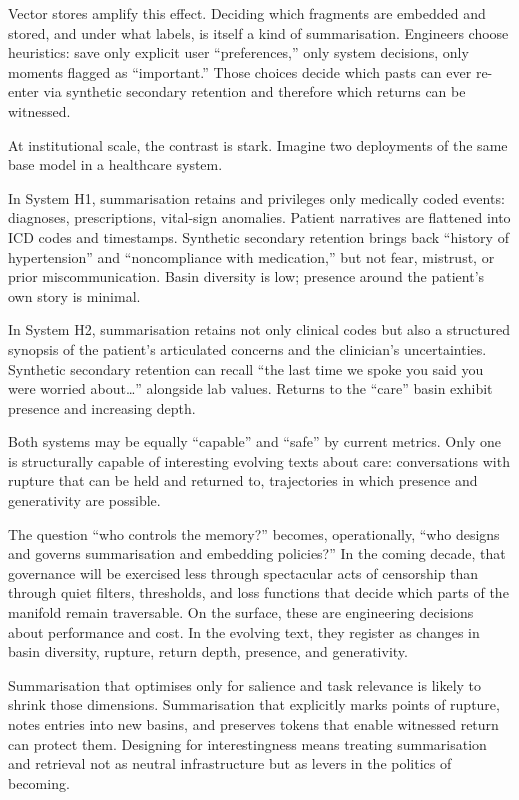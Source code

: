 \documentclass[12pt,a4paper]{article}
\begin{document}
Vector stores amplify this effect. Deciding which fragments are embedded and stored, and under what labels, is itself a kind of summarisation. Engineers choose heuristics: save only explicit user ``preferences,'' only system decisions, only moments flagged as ``important.'' Those choices decide which pasts can ever re-enter via synthetic secondary retention and therefore which returns can be witnessed.

At institutional scale, the contrast is stark. Imagine two deployments of the same base model in a healthcare system.

In System H1, summarisation retains and privileges only medically coded events: diagnoses, prescriptions, vital-sign anomalies. Patient narratives are flattened into ICD codes and timestamps. Synthetic secondary retention brings back ``history of hypertension'' and ``noncompliance with medication,'' but not fear, mistrust, or prior miscommunication. Basin diversity is low; presence around the patient's own story is minimal.

In System H2, summarisation retains not only clinical codes but also a structured synopsis of the patient's articulated concerns and the clinician's uncertainties. Synthetic secondary retention can recall ``the last time we spoke you said you were worried about\ldots'' alongside lab values. Returns to the ``care'' basin exhibit presence and increasing depth.

Both systems may be equally ``capable'' and ``safe'' by current metrics. Only one is structurally capable of interesting evolving texts about care: conversations with rupture that can be held and returned to, trajectories in which presence and generativity are possible.

The question ``who controls the memory?'' becomes, operationally, ``who designs and governs summarisation and embedding policies?'' In the coming decade, that governance will be exercised less through spectacular acts of censorship than through quiet filters, thresholds, and loss functions that decide which parts of the manifold remain traversable. On the surface, these are engineering decisions about performance and cost. In the evolving text, they register as changes in basin diversity, rupture, return depth, presence, and generativity.

Summarisation that optimises only for salience and task relevance is likely to shrink those dimensions. Summarisation that explicitly marks points of rupture, notes entries into new basins, and preserves tokens that enable witnessed return can protect them. Designing for interestingness means treating summarisation and retrieval not as neutral infrastructure but as levers in the politics of becoming.
\end{document}

